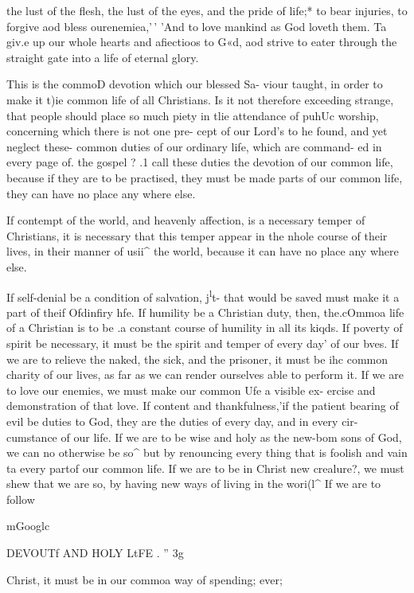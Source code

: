 \documentclass[
]{book}
\begin{document}
the lust of the flesh, the lust of the eyes, and the pride of life;* to bear injuries, to forgive aod bless ourenemiea,'\,' 'And to love mankind as God loveth them. Ta giv.e up our whole hearts and afiectioos to G«d, aod strive to eater through the straight gate into a life of eternal glory.

This is the commoD devotion which our blessed Sa- viour taught, in order to make it t)ie common life of all Christians. Is it not therefore exceeding strange, that people should place so much piety in tlie attendance of puhUc worship, concerning which there is not one pre- cept of our Lord's to he found, and yet neglect these- common duties of our ordinary life, which are command- ed in every page of. the gospel ? .1 call these duties the devotion of our common life, because if they are to be practised, they must be made parts of our common life, they can have no place any where else.

If contempt of the world, and heavenly affection, is a necessary temper of Christians, it is necessary that this temper appear in the nhole course of their lives, in their manner of usii\^{} the world, because it can have no place any where else.

If self-denial be a condition of salvation, j\textsuperscript{l}t- that would be saved must make it a part of theif Ofdinfiry hfe. If humility be a Christian duty, then, the.cOmmoa life of a Christian is to be .a constant course of humility in all its kiqds. If poverty of spirit be necessary, it must be the spirit and temper of every day' of our bves. If we are to relieve the naked, the sick, and the prisoner, it must be ihc common charity of our lives, as far as we can render ourselves able to perform it. If we are to love our enemies, we must make our common Ufe a visible ex- ercise and demonstration of that love. If content and thankfulness,'if the patient bearing of evil be duties to God, they are the duties of every day, and in every cir- cumstance of our life. If we are to be wise and holy as the new-bom sons of God, we can no otherwise be so\^{} but by renouncing every thing that is foolish and vain ta every partof our common life. If we are to be in Christ new crealure?, we must shew that we are so, by having new ways of living in the wori(l\^{} If we are to follow

mGooglc

DEVOUTf AND HOLY LtFE . '' 3g

Christ, it must be in our commoa way of spending; ever;
\end{document}
